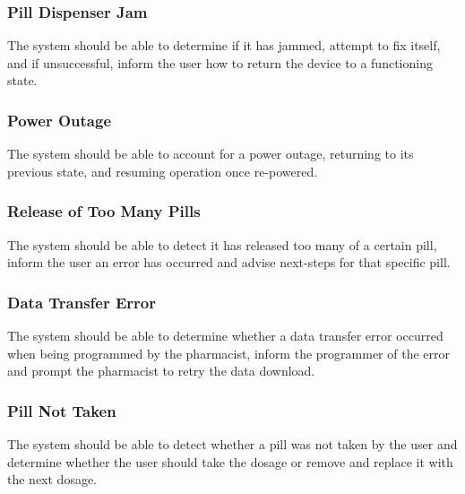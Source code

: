 \documentclass[12pt,titlepage]{article}
\begin{document}
\subsubsection{Pill Dispenser Jam}
The system should be able to determine if it has jammed, attempt to fix itself, and if unsuccessful, inform the user how to return the device to a functioning state.
\subsubsection{Power Outage}
The system should be able to account for a power outage, returning to its previous state, and resuming operation once re-powered.
\subsubsection{Release of Too Many Pills}
The system should be able to detect it has released too many of a certain pill, inform the user an error has occurred and advise next-steps for that specific pill.
\subsubsection{Data Transfer Error}
The system should be able to determine whether a data transfer error occurred when being programmed by the pharmacist, inform the programmer of the error and prompt the pharmacist to retry the data download.
\subsubsection{Pill Not Taken}
The system should be able to detect whether a pill was not taken by the user and determine whether the user should take the dosage or remove and replace it with the next dosage.
\end{document}
